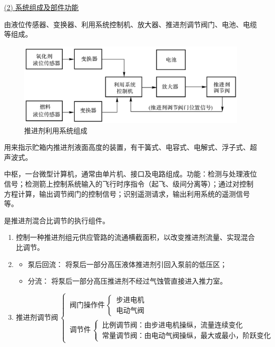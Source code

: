 \underline{(2) \hspace*{0.3em} 系统组成及部件功能}
\vspace*{0.5em}

\blue[基本组成]\quad 由液位传感器、变换器、利用系统控制机、放大器、推进剂调节阀门、电池、电缆等组成。
\begin{figure}[!htb]
	\centering
	\includegraphics[width=0.7\linewidth]{pic/推进剂利用.png}
	\caption{推进剂利用系统组成}
\end{figure}

\blue[液位传感器]\quad 用来指示贮箱内推进剂液面高度的装置，有干簧式、电容式、电解式、浮子式、超声波式。

\blue[控制机]\quad 中枢，一台微型计算机，通常由单片机、接口及电路组成。功能：检测与处理液位信号；检测箭上控制系统输入的飞行时序指令（起飞、级间分离等）；通过对控制方程计算，输出调节阀门的控制信号；识别遥测请求，输出利用系统的遥测信号等。

\blue[推进剂调节阀]\quad 是推进剂混合比调节的执行组件。
\vspace*{-0.5em}
\begin{enumerate}[\hspace*{3em}]
	\item \blue[工作原理]\quad 控制一种推进剂组元供应管路的流通横截面积，以改变推进剂流量、实现混合比调节。\vspace*{-0.5em}
	\item \blue[调节方式]
	\vspace*{-0.5em}
	\begin{itemize}
		\item 泵后回流： 将泵后一部分高压液体推进剂引回入泵前的低压区；\vspace*{-0.5em}
		\item 分流： 将泵后一部分高压推进剂不经过气蚀管直接进入推力室。\vspace*{-0.5em}
	\end{itemize}
	\item \blue[组成]
	\begin{equation*}
		\mbox{推进剂调节阀}
		\, \begin{cases}
			\, \mbox{阀门操作件} \,
			\begin{cases}
				\, \mbox{步进电机} \\
				\, \mbox{电动气阀}
			\end{cases}\\[1em]
			\, \mbox{调节件} \,
			\begin{cases}
				\, \mbox{比例调节阀：由步进电机操纵，流量连续变化} \\
				\, \mbox{常量调节阀：由电动气阀操纵，最大或最小，阶跃变化}
			\end{cases}
		\end{cases}
	\end{equation*}
\end{enumerate}

